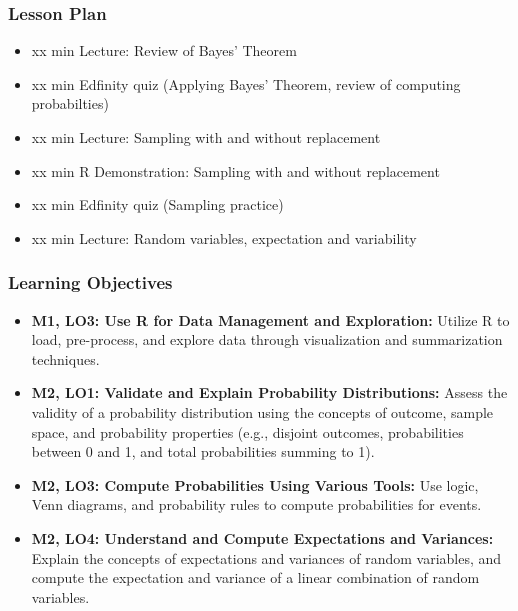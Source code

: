 \begin{frame}
    \frametitle{Lesson Plan}
    \begin{itemize}
        \item xx min Lecture: Review of Bayes' Theorem
        \item xx min Edfinity quiz (Applying Bayes' Theorem, review of computing probabilties)
        \item xx min Lecture: Sampling with and without replacement
        \item xx min R Demonstration: Sampling with and without replacement
        \item xx min Edfinity quiz (Sampling practice)
        \item xx min Lecture: Random variables, expectation and variability
    \end{itemize}
\end{frame}

\begin{frame}
    \frametitle{Learning Objectives}
    \begin{itemize}
        \item \textbf{M1, LO3: Use R for Data Management and Exploration:} Utilize R to load, pre-process, and explore data through visualization and summarization techniques.
        \item \textbf{M2, LO1: Validate and Explain Probability Distributions:} Assess the validity of a probability distribution using the concepts of outcome, sample space, and probability properties (e.g., disjoint outcomes, probabilities between 0 and 1, and total probabilities summing to 1).
        \item \textbf{M2, LO3: Compute Probabilities Using Various Tools:} Use logic, Venn diagrams, and probability rules to compute probabilities for events.
        \item \textbf{M2, LO4: Understand and Compute Expectations and Variances:} Explain the concepts of expectations and variances of random variables, and compute the expectation and variance of a linear combination of random variables.
    \end{itemize}
\end{frame}


